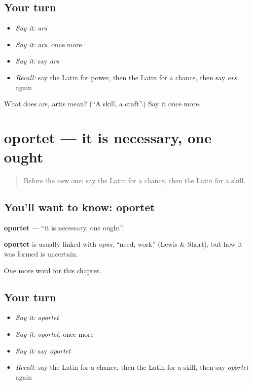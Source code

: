 \subsection*{Your turn}
\begin{itemize}
\raggedright
  \item \emph{Say it:} \emph{ars}
  \item \emph{Say it:} \emph{ars}, once more
  \item \emph{Say it:} say \emph{ars}
  \item \emph{Recall:} say the Latin for power, then the Latin for a chance, then say \emph{ars} again
\end{itemize}

\begin{tcolorbox}[breakable,colback=teal!4,colframe=teal!35!black,title={Before you move on}]
What does ars, artis mean? (\textquotedblleft{}A skill, a craft\textquotedblright{}.) Say it once more.
\end{tcolorbox}
\section[oportet]{oportet — it is necessary, one ought}

\label{lesson:LA-C110-oportet}



\begin{quote}
Before the new one: say the Latin for a chance, then the Latin for a skill.
\end{quote}

\subsection*{You'll want to know: oportet}
\textbf{oportet} — \textquotedblleft{}it is necessary, one ought\textquotedblright{}.

\begin{cousinweb}
\textbf{oportet} is usually linked with \emph{opus}, \textquotedblleft{}need, work\textquotedblright{} (Lewis \& Short), but how it was formed is uncertain.
\end{cousinweb}

\begin{grammarlens}[title={What you've built}]
One more word for this chapter.
\end{grammarlens}

\subsection*{Your turn}
\begin{itemize}
\raggedright
  \item \emph{Say it:} \emph{oportet}
  \item \emph{Say it:} \emph{oportet}, once more
  \item \emph{Say it:} say \emph{oportet}
  \item \emph{Recall:} say the Latin for a chance, then the Latin for a skill, then say \emph{oportet} again
\end{itemize}

